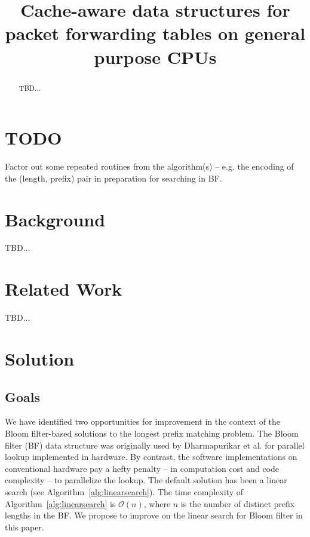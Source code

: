 \documentclass[conference,compsoc]{IEEEtran}
\begin{document}
\title{Cache-aware data structures for packet forwarding tables on general purpose CPUs}
\author{
}

\maketitle

\begin{abstract}
TBD...

\end{abstract}

\section{TODO}

Factor out some repeated routines from the algorithm(s) -- e.g. the
encoding of the (length, prefix) pair in preparation for searching in
BF.

\section{Background}
TBD...

\section{Related Work}
TBD...

\section{Solution}

\subsection{Goals}

We have identified two opportunities for improvement in the context of
the Bloom filter-based solutions to the longest prefix matching problem.
The Bloom filter (BF) data structure was originally used by Dharmapurikar et al.
\cite{Dharmapurikar}
for parallel lookup implemented in hardware. By contrast, the software
implementations on conventional hardware pay a hefty penalty -- in computation
cost and code complexity -- to parallelize the lookup. The default solution
has been a linear search (see Algorithm~\ref{alg:linearsearch}). The time
complexity of Algorithm~\ref{alg:linearsearch} is $\mathcal{O}(n)$, where $n$
is the number of distinct prefix lengths in the BF. We
propose to improve on the linear search for Bloom filter in this paper.
\end{document}
